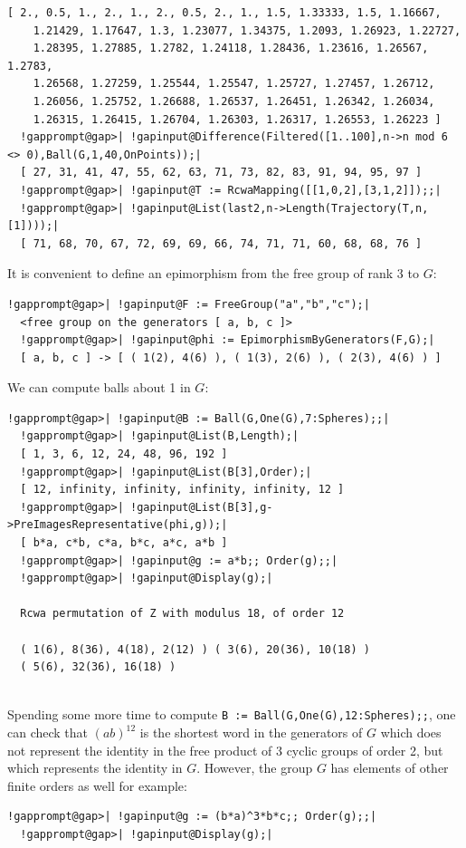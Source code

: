 \documentclass[a4paper,11pt]{report}
\begin{document}
{{\begin{Verbatim}[commandchars=!@|,fontsize=\small,frame=single,label=Example]
  [ 2., 0.5, 1., 2., 1., 2., 0.5, 2., 1., 1.5, 1.33333, 1.5, 1.16667, 
    1.21429, 1.17647, 1.3, 1.23077, 1.34375, 1.2093, 1.26923, 1.22727, 
    1.28395, 1.27885, 1.2782, 1.24118, 1.28436, 1.23616, 1.26567, 1.2783, 
    1.26568, 1.27259, 1.25544, 1.25547, 1.25727, 1.27457, 1.26712, 
    1.26056, 1.25752, 1.26688, 1.26537, 1.26451, 1.26342, 1.26034, 
    1.26315, 1.26415, 1.26704, 1.26303, 1.26317, 1.26553, 1.26223 ]
  !gapprompt@gap>| !gapinput@Difference(Filtered([1..100],n->n mod 6 <> 0),Ball(G,1,40,OnPoints));|
  [ 27, 31, 41, 47, 55, 62, 63, 71, 73, 82, 83, 91, 94, 95, 97 ]
  !gapprompt@gap>| !gapinput@T := RcwaMapping([[1,0,2],[3,1,2]]);;|
  !gapprompt@gap>| !gapinput@List(last2,n->Length(Trajectory(T,n,[1])));|
  [ 71, 68, 70, 67, 72, 69, 69, 66, 74, 71, 71, 60, 68, 68, 76 ]
\end{Verbatim}
 It is convenient to define an epimorphism from the free group of rank 3 to $G$: 
\begin{Verbatim}[commandchars=!@|,fontsize=\small,frame=single,label=Example]
  !gapprompt@gap>| !gapinput@F := FreeGroup("a","b","c");|
  <free group on the generators [ a, b, c ]>
  !gapprompt@gap>| !gapinput@phi := EpimorphismByGenerators(F,G);|
  [ a, b, c ] -> [ ( 1(2), 4(6) ), ( 1(3), 2(6) ), ( 2(3), 4(6) ) ]
\end{Verbatim}
 We can compute balls about 1 in $G$: 
\begin{Verbatim}[commandchars=!@|,fontsize=\small,frame=single,label=Example]
  !gapprompt@gap>| !gapinput@B := Ball(G,One(G),7:Spheres);;|
  !gapprompt@gap>| !gapinput@List(B,Length);|
  [ 1, 3, 6, 12, 24, 48, 96, 192 ]
  !gapprompt@gap>| !gapinput@List(B[3],Order);|
  [ 12, infinity, infinity, infinity, infinity, 12 ]
  !gapprompt@gap>| !gapinput@List(B[3],g->PreImagesRepresentative(phi,g));|
  [ b*a, c*b, c*a, b*c, a*c, a*b ]
  !gapprompt@gap>| !gapinput@g := a*b;; Order(g);;|
  !gapprompt@gap>| !gapinput@Display(g);|
  
  Rcwa permutation of Z with modulus 18, of order 12
  
  ( 1(6), 8(36), 4(18), 2(12) ) ( 3(6), 20(36), 10(18) )
  ( 5(6), 32(36), 16(18) )
  
\end{Verbatim}
 Spending some more time to compute \texttt{B := Ball(G,One(G),12:Spheres);;}, one can check that $(ab)^{12}$ is the shortest word in the generators of $G$ which does not represent the identity in the free product of 3 cyclic groups
of order 2, but which represents the identity in $G$. However, the group $G$ has elements of other finite orders as well
\texttt{}\texttt{} for example: 
\begin{Verbatim}[commandchars=!@|,fontsize=\small,frame=single,label=Example]
  !gapprompt@gap>| !gapinput@g := (b*a)^3*b*c;; Order(g);;|
  !gapprompt@gap>| !gapinput@Display(g);|
  

\end{Verbatim}}}
\end{document}
